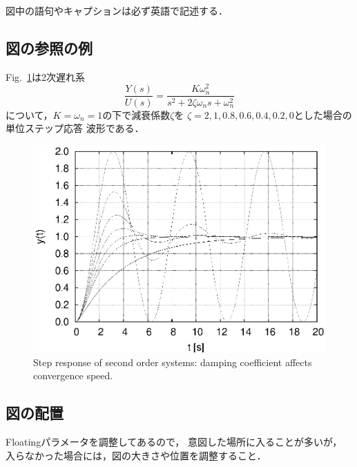 \documentclass[onecolumn]{jsarticle}
\begin{document}
図中の語句やキャプションは必ず英語で記述する．

\subsection{図の参照の例}
Fig.~\ref{fig:snapthru}は2次遅れ系
%
\begin{equation}
  \frac{Y(s)}{U(s)} = \frac{K\omega_n^2}{s^2+2\zeta \omega_n s + \omega_n^2}
\end{equation}
%
について，$K=\omega_n=1$の下で減衰係数$\zeta$を
$\zeta=2,1, 0.8, 0.6, 0.4, 0.2, 0$とした場合の単位ステップ応答
波形である．
%
\begin{figure}[tb]
  \centering
  \includegraphics[width=0.8\linewidth]{fig/StepResponse.eps}
  \caption{Step response of second order systems: 
    damping coefficient affects convergence speed.}
  \label{fig:snapthru}
\end{figure}

\subsection{図の配置}
Floatingパラメータを調整してあるので，
意図した場所に入ることが多いが，
入らなかった場合には，図の大きさや位置を調整すること．
\end{document}
